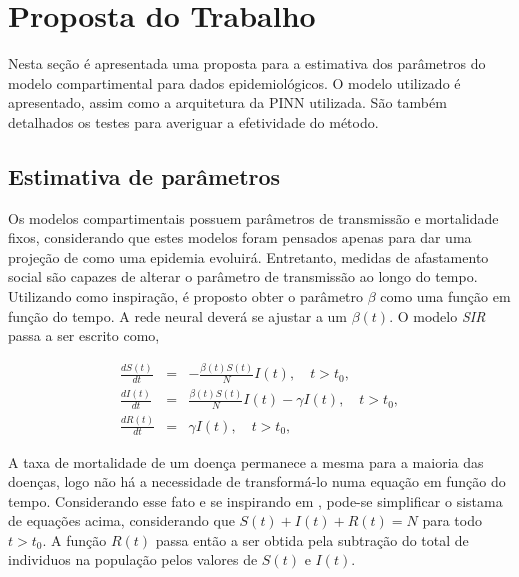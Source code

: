 \chapter{Proposta do Trabalho}
\label{sec-proposta}

Nesta seção é apresentada uma proposta para a estimativa dos parâmetros do 
modelo compartimental para dados epidemiológicos.
O modelo utilizado é apresentado, assim como a arquitetura da PINN utilizada.  
São também detalhados os testes para averiguar a efetividade do método.

\section{Estimativa de parâmetros}

Os modelos compartimentais possuem parâmetros de transmissão e mortalidade
fixos, considerando que estes modelos foram pensados apenas para dar 
uma projeção de como uma epidemia evoluirá. Entretanto, medidas de afastamento
social são capazes de alterar o parâmetro de transmissão ao longo do tempo.
Utilizando \cite{long-etal:21-L2} como inspiração, é proposto obter o parâmetro
$\beta$ como uma função em função do tempo. A rede neural deverá se ajustar 
a um $\beta(t)$. O modelo \textit{SIR} passa a ser escrito como, 

\begin{eqnarray}
   \frac{dS(t)}{dt} &=& -\frac{\beta(t) S(t)}{N} I(t),  \quad t > t_0, \label{eq:SIR-beta-t-1}\\
   \frac{dI(t)}{dt} &=& \frac{\beta(t) S(t)}{N} I(t) - \gamma I(t), \quad t > t_0, \label{eq:SIR-beta-t-2}\\
   \frac{dR(t)}{dt} &=& \gamma I(t),  \quad t > t_0, \label{eq:SIR-beta-t-3}
\end{eqnarray}

A taxa de mortalidade de um doença permanece a mesma para a maioria das doenças,
logo não há a necessidade de transformá-lo numa equação em função do tempo.
Considerando esse fato e se inspirando em \cite{millevoi-etal:24-split-join-pinns}, 
pode-se simplificar o sistama de equações acima, considerando que 
$S(t) + I(t) + R(t) = N$ para todo $t > t_0$.
A função $R(t)$ passa então a ser obtida pela subtração do total de individuos
na população pelos valores de $S(t)$ e $I(t)$.  

